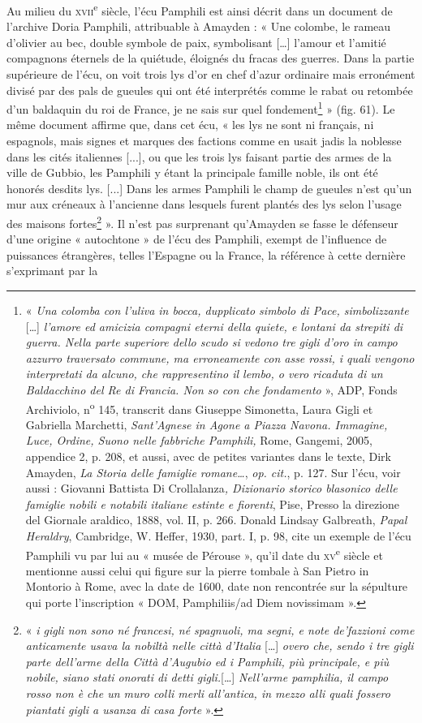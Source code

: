 \documentclass[12pt,twoside,openany]{book}
\begin{document}
Au milieu du \textsc{xvii}\textsuperscript{e} siècle, l’écu Pamphili est ainsi décrit dans un document de l’archive Doria Pamphili, attribuable à Amayden : « Une colombe, le rameau d’olivier au bec, double symbole de paix, symbolisant […] l’amour et l’amitié compagnons éternels de la quiétude, éloignés du fracas des guerres. Dans la partie supérieure de l’écu, on voit trois lys d’or en chef d’azur ordinaire mais erronément divisé par des pals de gueules qui ont été interprétés comme le rabat ou retombée d’un baldaquin du roi de France, je ne sais sur quel fondement\footnote{« \textit{Una colomba con l’uliva in bocca, dupplicato simbolo di Pace, simbolizzante }[…]\textit{ l’amore ed amicizia compagni eterni della quiete, e lontani da strepiti di guerra. Nella parte superiore dello scudo si vedono tre gigli d’oro in campo azzurro traversato commune, ma erroneamente con asse rossi, i quali vengono interpretati da alcuno, che rappresentino il lembo, o vero ricaduta di un Baldacchino del Re di Francia. Non so con che fondamento }», ADP, Fonds Archiviolo, n\textsuperscript{o} 145, transcrit dans Giuseppe Simonetta, Laura Gigli et Gabriella Marchetti, \textit{Sant’Agnese in Agone a Piazza Navona. Immagine, Luce, Ordine, Suono nelle fabbriche Pamphili, }Rome, Gangemi, 2005, appendice 2, p. 208, et aussi, avec de petites variantes dans le texte, Dirk Amayden, \textit{La Storia delle famiglie romane…}, \textit{op. cit.}, p. 127. Sur l’écu, voir aussi : Giovanni Battista Di Crollalanza\textit{, Dizionario storico blasonico delle famiglie nobili e notabili italiane estinte e fiorenti}, Pise, Presso la direzione del Giornale araldico, 1888, vol. II, p. 266. Donald Lindsay Galbreath, \textit{Papal Heraldry}, Cambridge, W. Heffer, 1930, part. I, p. 98, cite un exemple de l’écu Pamphili vu par lui au « musée de Pérouse », qu’il date du \textsc{xv}\textsuperscript{e} siècle et mentionne aussi celui qui figure sur la pierre tombale à San Pietro in Montorio à Rome, avec la date de 1600, date non rencontrée sur la sépulture qui porte l’inscription « DOM, Pamphiliis/ad Diem novissimam ».} » (fig. 61). Le même document affirme que, dans cet écu, « les lys ne sont ni français, ni espagnols, mais signes et marques des factions comme en usait jadis la noblesse dans les cités italiennes [...], ou que les trois lys faisant partie des armes de la ville de Gubbio, les Pamphili y étant la principale famille noble, ils ont été honorés desdits lys. [...] Dans les armes Pamphili le champ de gueules n’est qu’un mur aux créneaux à l’ancienne dans lesquels furent plantés des lys selon l’usage des maisons fortes\footnote{« \textit{i gigli non sono né francesi, né spagnuoli, ma segni, e note de’fazzioni come anticamente usava la nobiltà nelle città d’Italia }[…] \textit{overo che, sendo i tre gigli parte dell’arme della Città d’Augubio ed i Pamphili, più principale, e più nobile, siano stati onorati di detti gigli.}[…]\textit{ Nell’arme pamphilia, il campo rosso non è che un muro colli merli all’antica, in mezzo alli quali fossero piantati gigli a usanza di casa forte} ».} ». Il n’est pas surprenant qu’Amayden se fasse le défenseur d’une origine « autochtone » de l’écu des Pamphili, exempt de l’influence de puissances étrangères, telles l’Espagne ou la France, la référence à cette dernière s’exprimant par la 
\end{document}
